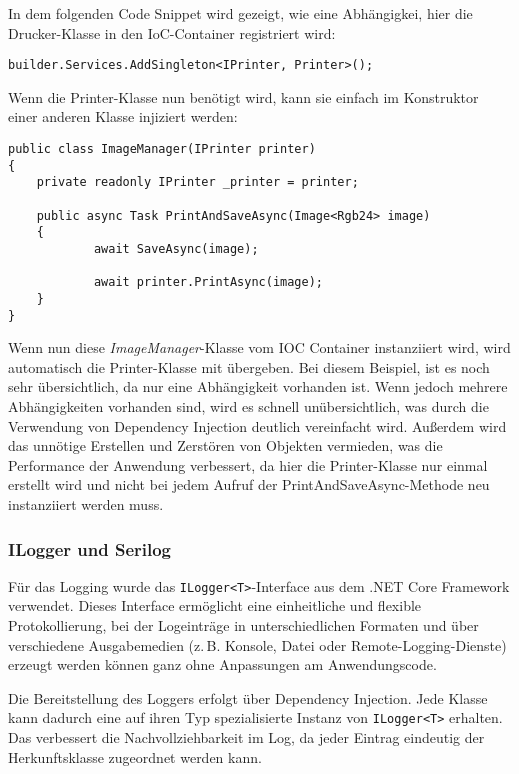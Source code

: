 In dem folgenden Code Snippet wird gezeigt, wie eine Abhängigkei, hier die 
Drucker-Klasse in den IoC-Container registriert wird:

\begin{lstlisting}
builder.Services.AddSingleton<IPrinter, Printer>();
\end{lstlisting}    

Wenn die Printer-Klasse nun benötigt wird, kann sie einfach im Konstruktor
einer anderen Klasse injiziert werden:

\begin{lstlisting}
public class ImageManager(IPrinter printer)
{
    private readonly IPrinter _printer = printer;

    public async Task PrintAndSaveAsync(Image<Rgb24> image)
    {
            await SaveAsync(image);

            await printer.PrintAsync(image);
    }
}
\end{lstlisting}

Wenn nun diese \emph{ImageManager}-Klasse vom IOC Container instanziiert wird,
wird automatisch die Printer-Klasse mit übergeben. Bei diesem Beispiel, 
ist es noch sehr übersichtlich, da nur eine Abhängigkeit vorhanden ist.
Wenn jedoch mehrere Abhängigkeiten vorhanden sind, wird es schnell
unübersichtlich, was durch die Verwendung von Dependency Injection
deutlich vereinfacht wird. Außerdem wird das unnötige Erstellen und
Zerstören von Objekten vermieden, was die Performance der Anwendung
verbessert, da hier die Printer-Klasse nur einmal erstellt wird und
nicht bei jedem Aufruf der PrintAndSaveAsync-Methode neu instanziiert werden muss.

\subsubsection{ILogger und Serilog}

Für das Logging wurde das \texttt{ILogger\textless{}T\textgreater{}}-Interface
aus dem .NET Core Framework verwendet. Dieses Interface ermöglicht eine
einheitliche und flexible Protokollierung, bei der Logeinträge in
unterschiedlichen Formaten und über verschiedene Ausgabemedien
(z.\,B. Konsole, Datei oder Remote-Logging-Dienste) erzeugt werden können 
ganz ohne Anpassungen am Anwendungscode.

Die Bereitstellung des Loggers erfolgt über Dependency Injection.
Jede Klasse kann dadurch eine auf ihren Typ spezialisierte Instanz von
\texttt{ILogger\textless{}T\textgreater{}} erhalten. Das verbessert die
Nachvollziehbarkeit im Log, da jeder Eintrag eindeutig der Herkunftsklasse
zugeordnet werden kann.

